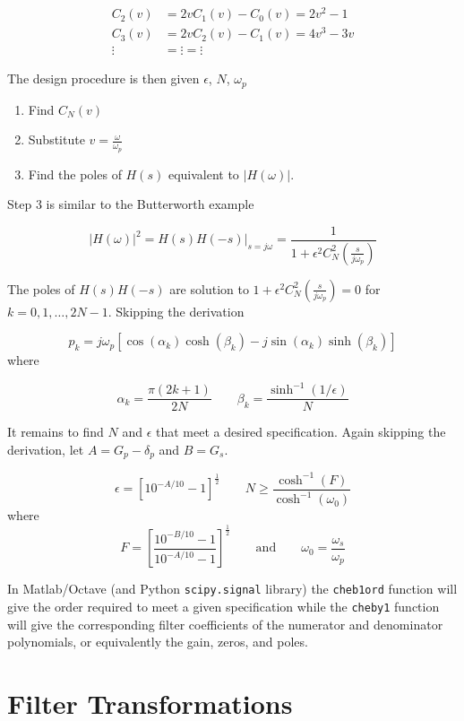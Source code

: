 \documentclass{article}
\begin{document}
\begin{align*}
  C_2(v) &= 2v C_1(v) - C_0(v) = 2v^2 - 1\\
  C_3(v) &= 2v C_2(v) - C_1(v) = 4v^3 - 3v\\
  \vdots &= \vdots = \vdots
\end{align*}

The design procedure is then given $\epsilon$, $N$, $\omega_p$

\begin{enumerate}
\item Find $C_N(v)$
\item Substitute $v = \frac{\omega}{\omega_p}$
\item Find the poles of $H(s)$ equivalent to $|H(\omega)|$.
\end{enumerate}

Step 3 is similar to the Butterworth example

\[
\left| H(\omega) \right|^2 = \left. H(s)H(-s) \right|_{s=j\omega} = \frac{1}{1 + \epsilon^2C_N^2\left( \frac{s}{j\omega_p}\right)}
\]

The poles of $H(s)H(-s)$ are solution to $1 + \epsilon^2C_N^2\left( \frac{s}{j\omega_p}\right) = 0$ for $k = 0,1,\ldots, 2N-1$. Skipping the derivation

\[
p_k = j\omega_p \left[\cos(\alpha_k)\cosh(\beta_k) - j\sin(\alpha_k)\sinh(\beta_k) \right]
\]
where

\[
\alpha_k = \frac{\pi(2k+1)}{2N} \qquad \beta_k = \frac{\sinh^{-1}(1/\epsilon)}{N}
\]

It remains to find $N$ and $\epsilon$ that meet a desired specification. Again skipping the derivation, let $A = G_p - \delta_p$ and $B = G_s$.

\[
\epsilon = \left[10^{-A/10} - 1\right]^{\frac{1}{2}} \qquad N \geq \frac{\cosh^{-1}(F)}{\cosh^{-1}(\omega_0)}
\]
where
\[
F = \left[ \frac{10^{-B/10} - 1}{10^{-A/10} - 1} \right]^{\frac{1}{2}} \qquad\text{and}\qquad \omega_0 = \frac{\omega_s}{\omega_p}
\]

In Matlab/Octave (and Python \texttt{scipy.signal} library) the \texttt{cheb1ord} function will give the order required to meet a given specification while the \texttt{cheby1} function will give the corresponding filter coefficients of the numerator and denominator polynomials, or equivalently the gain, zeros, and poles.

\section{Filter Transformations}
\end{document}
